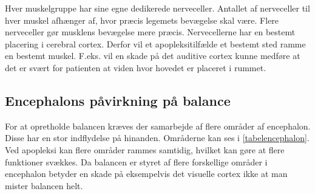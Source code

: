 
Hver muskelgruppe har sine egne dedikerede nerveceller. Antallet af nerveceller til hver muskel afhænger af, hvor præcis legemets bevægelse skal være. Flere nerveceller gør musklens bevægelse mere præcis. \cite{Stanfield2014} Nervecellerne har en bestemt placering i cerebral cortex. Derfor vil et apopleksitilfælde et bestemt sted ramme en bestemt muskel. F.eks. vil en skade på det auditive cortex kunne medføre at det er svært for patienten at viden hvor hovedet er placeret i rummet. \cite{Mao2014} 

\subsection{Encephalons påvirkning på balance}
For at opretholde balancen kræves der samarbejde af flere områder af encephalon. Disse har en stor indflydelse på hinanden. Områderne kan ses i \ref{tabelencephalon}. Ved apopleksi kan flere områder rammes samtidig, hvilket kan gøre at flere funktioner svækkes. Da balancen er styret af flere forskellige områder i encephalon betyder en skade på eksempelvis det visuelle cortex ikke at man mister balancen helt. 

